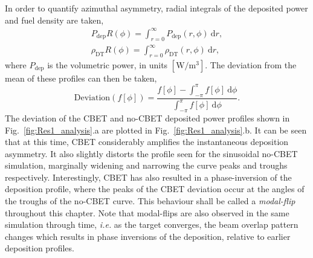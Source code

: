 In order to quantify azimuthal asymmetry, radial integrals of the deposited power and fuel density are taken,
\begin{equation}
    \label{eq:Res1_radint}
    \begin{gathered}
        P_{\text{dep}}R(\phi) = \int_{r=0}^{\infty} P_{\text{dep}}(r,\phi)\ \text{d}r, \\
        \rho_{\text{DT}}R(\phi) = \int_{r=0}^{\infty} \rho_{\text{DT}}(r,\phi)\ \text{d}r,
    \end{gathered}
\end{equation}
where $P_{\text{dep}}$ is the volumetric power, in units $[\text{W}/\text{m}^{3}]$.
The deviation from the mean of these profiles can then be taken,
\begin{equation}
    \text{Deviation}\left(f[\phi]\right) = \frac{f[\phi] - \int_{-\pi}^{\pi} f[\phi]\ \text{d}\phi}{\int_{-\pi}^{\pi} f[\phi]\ \text{d}\phi}.
\end{equation}
The deviation of the \ac{CBET} and no-\ac{CBET} deposited power profiles shown in Fig.~\ref{fig:Res1_analysis}.a are plotted in Fig.~\ref{fig:Res1_analysis}.b.
It can be seen that at this time, \ac{CBET} considerably amplifies the instantaneous deposition asymmetry.
It also slightly distorts the profile seen for the sinusoidal no-\ac{CBET} simulation, marginally widening and narrowing the curve peaks and troughs respectively.
Interestingly, \ac{CBET} has also resulted in a phase-inversion of the deposition profile, where the peaks of the \ac{CBET} deviation occur at the angles of the troughs of the no-\ac{CBET} curve.
This behaviour shall be called a \textit{modal-flip} throughout this chapter.
Note that modal-flips are also observed in the same simulation through time, \textit{i.e.} as the target converges, the beam overlap pattern changes which results in phase inversions of the deposition, relative to earlier deposition profiles.

